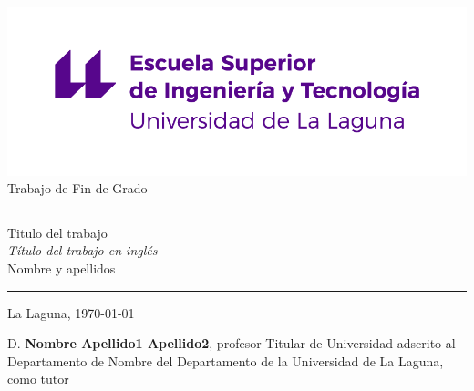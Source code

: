 \documentclass[spanish,a4paper,12pt,oneside]{extreport}
\begin{document}
\renewcommand\listtablename{Índice de Tablas}    
\renewcommand\listfigurename{Índice de Figuras}    

\pagestyle{empty}
\thispagestyle{empty}


\newcommand{\HRule}{\rule{\linewidth}{1mm}}
\setlength{\parindent}{0mm}
\setlength{\parskip}{0mm}


\begin{center}
\includegraphics[scale=0.8]{images/escuela-ingenieria-tecnologia-original}\\[10mm]
{\Huge Trabajo de Fin de Grado}
\end{center}

\HRule
\begin{flushright}
        {\Huge Titulo del trabajo} \\[2.5mm]
        {\Large \textit{Título del trabajo en inglés}} \\[5mm]
        {\Large Nombre y apellidos} \\[5mm]


\end{flushright}
\HRule
{}
\begin{center}
  \Large La Laguna, \today
\end{center}

\setlength{\parindent}{5mm}

\newpage
\thispagestyle{empty}

D. {\bf Nombre Apellido1 Apellido2}, profesor Titular de Universidad adscrito al Departamento de Nombre del Departamento de la Universidad de La Laguna, como tutor
\end{document}
